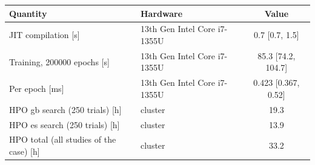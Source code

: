 \begin{tabular}{llc}
\toprule
Quantity & Hardware & Value \\
\midrule
JIT compilation [s] & 13th Gen Intel Core i7-1355U & \num{0.7} [\num{0.7}, \num{1.5}] \\
Training, \num{200000} epochs [s] & 13th Gen Intel Core i7-1355U & \num{85.3} [\num{74.2}, \num{104.7}] \\
Per epoch [ms] & 13th Gen Intel Core i7-1355U & \num{0.423} [\num{0.367}, \num{0.52}] \\
HPO gb search (250 trials) [h] & cluster & \num{19.3} \\
HPO es search (250 trials) [h] & cluster & \num{13.9} \\
HPO total (all studies of the case) [h] & cluster & \num{33.2} \\
\bottomrule
\end{tabular}
